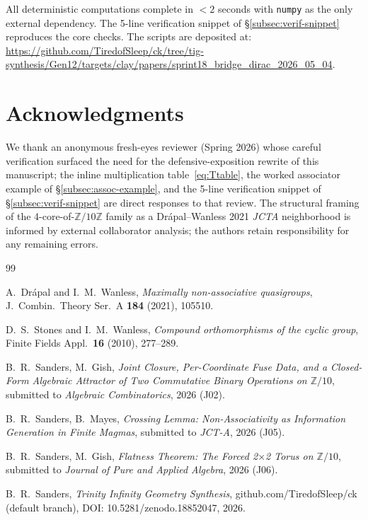 \documentclass[11pt,reqno]{amsart}
\theoremstyle{plain}
\theoremstyle{definition}
\theoremstyle{remark}
\newcommand{\Z}{\mathbb{Z}}
\begin{document}
All deterministic computations complete in $<2$ seconds with
\texttt{numpy} as the only external dependency. The 5-line
verification snippet of §\ref{subsec:verif-snippet} reproduces the
core checks. The scripts are deposited at:
\url{https://github.com/TiredofSleep/ck/tree/tig-synthesis/Gen12/targets/clay/papers/sprint18_bridge_dirac_2026_05_04}.

\section*{Acknowledgments}

We thank an anonymous fresh-eyes reviewer (Spring 2026) whose careful
verification surfaced the need for the defensive-exposition rewrite of
this manuscript; the inline multiplication table~\eqref{eq:Ttable},
the worked associator example of §\ref{subsec:assoc-example}, and the
5-line verification snippet of §\ref{subsec:verif-snippet} are direct
responses to that review. The structural framing of the
4-core-of-$\Z/10\Z$ family as a Drápal--Wanless 2021 \emph{JCTA}
neighborhood is informed by external collaborator analysis; the
authors retain responsibility for any remaining errors.

\begin{thebibliography}{99}

A.~Drápal and I.~M.~Wanless,
\emph{Maximally non-associative quasigroups},
J.~Combin.~Theory Ser.~A \textbf{184} (2021), 105510.

D.~S.~Stones and I.~M.~Wanless,
\emph{Compound orthomorphisms of the cyclic group},
Finite Fields Appl.\ \textbf{16} (2010), 277--289.

 B.~R.~Sanders, M.~Gish,
\emph{Joint Closure, Per-Coordinate Fuse Data, and a Closed-Form
Algebraic Attractor of Two Commutative Binary Operations on
$\Z/10$}, submitted to \emph{Algebraic Combinatorics}, 2026 (J02).

 B.~R.~Sanders, B.~Mayes,
\emph{Crossing Lemma: Non-Associativity as Information Generation in
Finite Magmas}, submitted to \emph{JCT-A}, 2026 (J05).

 B.~R.~Sanders, M.~Gish,
\emph{Flatness Theorem: The Forced 2$\times$2 Torus on $\Z/10$},
submitted to \emph{Journal of Pure and Applied Algebra}, 2026 (J06).

 B.~R.~Sanders,
\emph{Trinity Infinity Geometry Synthesis},
github.com/TiredofSleep/ck (default branch),
DOI: 10.5281/zenodo.18852047, 2026.

\end{thebibliography}
\end{document}
